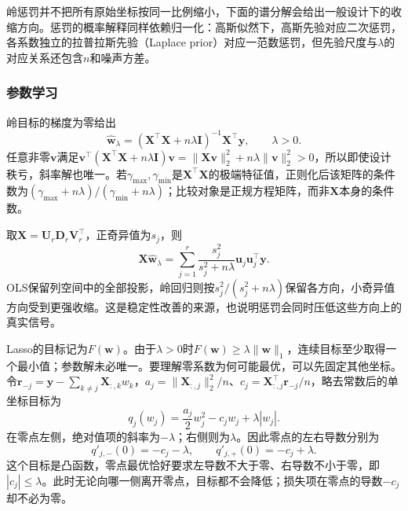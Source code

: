 岭惩罚并不把所有原始坐标按同一比例缩小，下面的谱分解会给出一般设计下的收缩方向。惩罚的概率解释同样依赖归一化：高斯似然下，高斯先验对应二次惩罚，各系数独立的拉普拉斯先验（Laplace prior）对应一范数惩罚，但先验尺度与$\lambda$的对应关系还包含$n$和噪声方差。

\subsubsection{参数学习}
\label{sec:regression-regularization-learning}

岭目标的梯度为零给出
\begin{equation}
  \widehat{\bm{w}}_{\lambda}
  =(\bm{X}^{\top}\bm{X}+n\lambda\bm{I})^{-1}\bm{X}^{\top}\bm{y},
  \qquad\lambda>0.
  \label{eq:regression-ridge-solution}
\end{equation}
任意非零$\bm{v}$满足$\bm{v}^{\top}(\bm{X}^{\top}\bm{X}+n\lambda\bm{I})\bm{v}=\lVert\bm{X}\bm{v}\rVert_2^2+n\lambda\lVert\bm{v}\rVert_2^2>0$，所以即使设计秩亏，斜率解也唯一。若$\gamma_{\max},\gamma_{\min}$是$\bm{X}^{\top}\bm{X}$的极端特征值，正则化后该矩阵的条件数为$(\gamma_{\max}+n\lambda)/(\gamma_{\min}+n\lambda)$；比较对象是正规方程矩阵，而非$\bm{X}$本身的条件数。

取$\bm{X}=\bm{U}_r\bm{D}_r\bm{V}_r^{\top}$，正奇异值为$s_j$，则
\begin{equation}
  \bm{X}\widehat{\bm{w}}_{\lambda}
  =\sum_{j=1}^{r}\frac{s_j^2}{s_j^2+n\lambda}
       \bm{u}_j\bm{u}_j^{\top}\bm{y}.
  \label{eq:regression-ridge-spectral}
\end{equation}
OLS保留列空间中的全部投影，岭回归则按$s_j^2/(s_j^2+n\lambda)$保留各方向，小奇异值方向受到更强收缩。这是稳定性改善的来源，也说明惩罚会同时压低这些方向上的真实信号。

Lasso的目标记为$F(\bm{w})$。由于$\lambda>0$时$F(\bm{w})\geq\lambda\lVert\bm{w}\rVert_1$，连续目标至少取得一个最小值；参数解未必唯一。要理解零系数为何可能最优，可以先固定其他坐标。令$\bm{r}_{-j}=\bm{y}-\sum_{k\ne j}\bm{X}_{:,k}w_k$，$a_j=\lVert\bm{X}_{:,j}\rVert_2^2/n$、$c_j=\bm{X}_{:,j}^{\top}\bm{r}_{-j}/n$，略去常数后的单坐标目标为
\[
  q_j(w_j)=\frac{a_j}{2}w_j^2-c_jw_j+\lambda|w_j|.
\]
在零点左侧，绝对值项的斜率为$-\lambda$；右侧则为$\lambda$。因此零点的左右导数分别为
\[
  q'_{j,-}(0)=-c_j-\lambda,\qquad
  q'_{j,+}(0)=-c_j+\lambda.
\]
这个目标是凸函数，零点最优恰好要求左导数不大于零、右导数不小于零，即$|c_j|\leq\lambda$。此时无论向哪一侧离开零点，目标都不会降低；损失项在零点的导数$-c_j$却不必为零。

